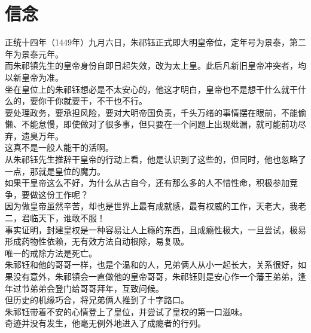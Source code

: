 \section{信念}
\ifnum{}
	\begin{multicols}{\theparacolNo}
\fi
正统十四年（1449年）九月六日，朱祁钰正式即大明皇帝位，定年号为景泰，第二年为景泰元年。\\

而朱祁镇先生的皇帝身份自即日起失效，改为太上皇。此后凡新旧皇帝冲突者，均以新皇帝为准。\\

坐在皇位上的朱祁钰想必是不太安心的，他这才明白，皇帝也不是想干什么就干什么的，要你干你就要干，不干也不行。\\

要处理政务，要承担风险，要对大明帝国负责，千头万绪的事情摆在眼前，不能偷懒、不能怠慢，即使做对了很多事，但只要在一个问题上出现纰漏，就可能前功尽弃，遗臭万年。\\

这真不是一般人能干的活啊。\\

从朱祁钰先生推辞干皇帝的行动上看，他是认识到了这些的，但同时，他也忽略了一点，那就是皇位的魔力。\\

如果干皇帝这么不好，为什么从古自今，还有那么多的人不惜性命，积极参加竞争，要做这份工作呢？\\

因为做皇帝虽然辛苦，却也是世界上最有成就感，最有权威的工作，天老大，我老二，君临天下，谁敢不服！\\

事实证明，封建皇权是一种容易让人上瘾的东西，且成瘾性极大，一旦尝试，极易形成药物性依赖，无有效方法自动根除，易复吸。\\

唯一的戒除方法是死亡。\\

朱祁钰和他的哥哥一样，也是个温和的人，兄弟俩人从小一起长大，关系很好，如果没有意外，朱祁镇会一直做他的皇帝哥哥，朱祁钰则是安心作一个藩王弟弟，逢年过节弟弟会登门给哥哥拜年，互致问候。\\

但历史的机缘巧合，将兄弟俩人推到了十字路口。\\

朱祁钰带着不安的心情登上了皇位，并尝试了皇权的第一口滋味。\\

奇迹并没有发生，他毫无例外地进入了成瘾者的行列。\\


\end{multicols}
